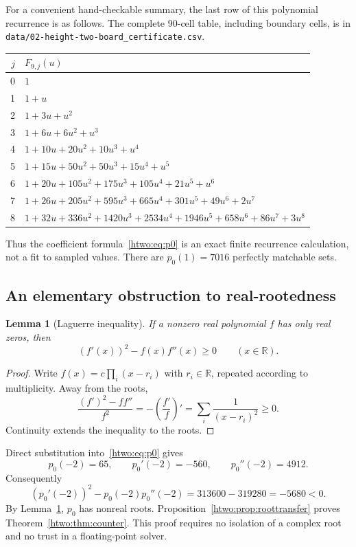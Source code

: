 \documentclass[11pt]{article}
\numberwithin{equation}{section}
\newtheorem{lemma}[theorem]{Lemma}
\theoremstyle{definition}
\newcommand{\R}{\mathbb R}
\begin{document}
For a convenient hand-checkable summary, the last row of this polynomial
recurrence is as follows. The complete 90-cell table, including boundary
cells, is in \nolinkurl{data/02-height-two-board_certificate.csv}.
\begin{center}
\small
\begin{tabularx}{\textwidth}{@{}rY@{}}
\toprule
$j$ & $F_{9,j}(u)$\\ & $1$\\
1 & $1+u$\\
2 & $1+3u+u^2$\\
3 & $1+6u+6u^2+u^3$\\
4 & $1+10u+20u^2+10u^3+u^4$\\
5 & $1+15u+50u^2+50u^3+15u^4+u^5$\\
6 & $1+20u+105u^2+175u^3+105u^4+21u^5+u^6$\\
7 & $1+26u+205u^2+595u^3+665u^4+301u^5+49u^6+2u^7$\\
8 & $1+32u+336u^2+1420u^3+2534u^4+1946u^5+658u^6+86u^7+3u^8$\\
\bottomrule
\end{tabularx}
\end{center}
Thus the coefficient formula~\eqref{htwo:eq:p0} is an exact finite recurrence
calculation, not a fit to sampled values. There are $p_0(1)=7016$
perfectly matchable sets.

\subsection{An elementary obstruction to real-rootedness}

\begin{lemma}[Laguerre inequality]\label{htwo:lem:laguerre}
If a nonzero real polynomial $f$ has only real zeros, then
\begin{equation}
 (f'(x))^2-f(x)f''(x)\ge0\qquad(x\in\R).\label{htwo:eq:laguerre}
\end{equation}
\end{lemma}
\begin{proof}
Write $f(x)=c\prod_i(x-r_i)$ with $r_i\in\R$, repeated according to
multiplicity. Away from the roots,
\[
 \frac{(f')^2-ff''}{f^2}
    =-\left(\frac{f'}f\right)'=\sum_i\frac1{(x-r_i)^2}\ge0.
\]
Continuity extends the inequality to the roots.
\end{proof}

Direct substitution into~\eqref{htwo:eq:p0} gives
\begin{equation}
 p_0(-2)=65,\qquad p_0'(-2)=-560,\qquad p_0''(-2)=4912.
\end{equation}
Consequently
\begin{equation}
 \boxed{\ (p_0'(-2))^2-p_0(-2)p_0''(-2)
       =313600-319280=-5680<0.\ }\label{htwo:eq:exactcertificate}
\end{equation}
By Lemma~\ref{htwo:lem:laguerre}, $p_0$ has nonreal roots.
Proposition~\ref{htwo:prop:roottransfer} proves Theorem~\ref{htwo:thm:counter}.
This proof requires no isolation of a complex root and no trust in a
floating-point solver.
\end{document}
